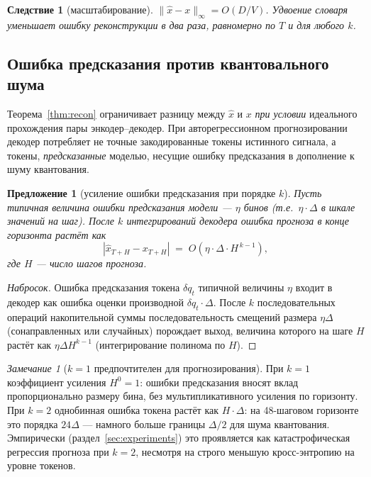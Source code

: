 \documentclass[11pt]{article}
\newtheorem{proposition}[theorem]{Предложение}
\newtheorem{corollary}[theorem]{Следствие}
\theoremstyle{remark}
\newtheorem{remark}[theorem]{Замечание}
\begin{document}
\begin{corollary}[масштабирование]
$\|\hat x - x\|_\infty = O(D/V)$. Удвоение словаря уменьшает ошибку
реконструкции в два раза, равномерно по $T$ и для любого $k$.
\end{corollary}

\subsection{Ошибка предсказания против квантовального шума}
\label{sec:pred-compound}

Теорема~\ref{thm:recon} ограничивает разницу между $\hat x$ и $x$
\emph{при условии} идеального прохождения пары энкодер--декодер. При
авторегрессионном прогнозировании декодер потребляет не точные
закодированные токены истинного сигнала, а токены,
\emph{предсказанные} моделью, несущие ошибку предсказания в дополнение
к шуму квантования.

\begin{proposition}[усиление ошибки предсказания при порядке $k$]
\label{prop:pred}
Пусть типичная величина ошибки предсказания модели --- $\eta$ бинов
(т.е.\ $\eta \cdot \Delta$ в шкале значений на шаг). После $k$
интегрирований декодера ошибка прогноза в конце горизонта растёт как
\begin{equation}
|\hat x_{T+H} - x_{T+H}| \;=\; O\!\left(\eta \cdot \Delta \cdot H^{\,k-1}\right),
\end{equation}
где $H$ --- число шагов прогноза.
\end{proposition}

\begin{proof}[Набросок]
Ошибка предсказания токена $\delta q_t$ типичной величины $\eta$ входит
в декодер как ошибка оценки производной $\delta q_t \cdot \Delta$. После
$k$ последовательных операций накопительной суммы последовательность
смещений размера $\eta \Delta$ (сонаправленных или случайных) порождает
выход, величина которого на шаге $H$ растёт как $\eta \Delta H^{k-1}$
(интегрирование полинома по $H$).
\end{proof}

\begin{remark}[$k=1$ предпочтителен для прогнозирования]
При $k=1$ коэффициент усиления $H^0 = 1$: ошибки предсказания вносят
вклад пропорционально размеру бина, без мультипликативного усиления по
горизонту. При $k=2$ однобинная ошибка токена растёт как
$H \cdot \Delta$: на 48-шаговом горизонте это порядка $24 \Delta$ ---
намного больше границы $\Delta/2$ для шума квантования. Эмпирически
(раздел~\ref{sec:experiments}) это проявляется как катастрофическая
регрессия прогноза при $k=2$, несмотря на строго меньшую
кросс-энтропию на уровне токенов.
\end{remark}
\end{document}
